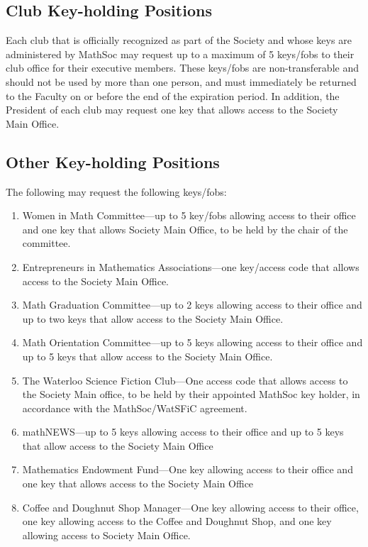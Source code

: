 \subsection{Club Key-holding Positions}
Each club that is officially recognized as part of the Society and whose keys
are administered by MathSoc may request up to a maximum of 5 keys/fobs to their
club office for their executive members. These keys/fobs are non-transferable
and should not be used by more than one person, and must immediately be
returned to the Faculty on or before the end of the expiration period. In
addition, the President of each club may request one key that allows access to
the Society Main Office.

\subsection{Other Key-holding Positions}
The following may request the following keys/fobs:
\begin{enumerate}
  \item Women in Math Committee---up to 5 key/fobs allowing access to their
    office and one key that allows Society Main Office, to be held by the chair
    of the committee.
  \item Entrepreneurs in Mathematics Associations---one key/access code that allows
  access to the Society Main Office. 
  \item Math Graduation Committee---up to 2 keys allowing access to their
    office and up to two keys that allow access to the Society Main Office.
  \item Math Orientation Committee---up to 5 keys allowing access to their
    office and up to 5 keys that allow access to the Society Main Office.
  \item The Waterloo Science Fiction Club---One access code that allows access to the
    Society Main office, to be held by their appointed MathSoc key holder, in
    accordance with the MathSoc/WatSFiC agreement.
  \item mathNEWS---up to 5 keys allowing access to their office and up to 5
    keys that allow access to the Society Main Office
  \item Mathematics Endowment Fund---One key allowing access to their office
    and one key that allows access to the Society Main Office
  \item Coffee and Doughnut Shop Manager---One key allowing access to their
    office, one key allowing access to the Coffee and Doughnut Shop, and one
    key allowing access to Society Main Office.
\end{enumerate}
